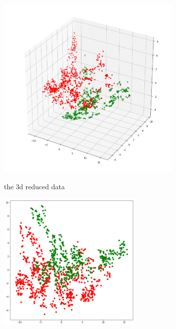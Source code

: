 \documentclass[14pt]{article}
\theoremstyle{plain}
\theoremstyle{definition}
\begin{document}
\begin{table}[ht]
\begin{minipage}[b]{0.56\linewidth}
\centering
\includegraphics[width=90mm]{banknote_forgery_files/model_1}
 \caption{the 3d reduced data}
    \label{table:student}
\end{minipage}\hfill
\begin{minipage}[b]{0.4\linewidth}
\centering
\includegraphics[width=70mm]{banknote_forgery_files/model_2}
\vspace{0.29in}
\label{boxplot}
\end{minipage}
\end{table}
\end{document}
